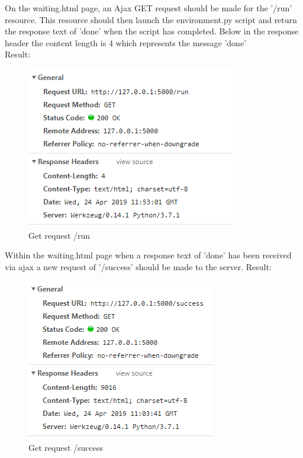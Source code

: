 \begin{enumerate}
	On the waiting.html page, an Ajax GET request should be made for the '/run' resource. This resource should then launch the environment.py script and return the response text of 'done' when the script has completed. Below in the response header the content length is 4 which represents the message 'done'\\
	Result:
	\begin{figure}[H]
		\centering
		\includegraphics[width=0.7\linewidth]{"img/Run GET"}
		\caption{Get request /run}
		\label{fig:run-get}
	\end{figure}
	
	Within the waiting.html page when a response text of 'done' has been received via ajax a new request of '/success' should be made to the server.
	Result:
	\begin{figure}[h]
		\centering
		\includegraphics[width=0.7\linewidth]{img/SuccessResource}
		\caption{Get request /success}
		\label{fig:successresource}
	\end{figure}
	

\end{enumerate}
